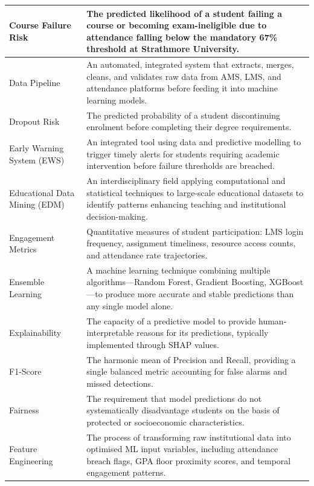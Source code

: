 \documentclass[12pt]{report}
\begin{document}
\begin{center}
\begin{longtable}{|L{3.8cm}|L{10cm}|}
 Course Failure Risk & The predicted likelihood of a student failing a course or becoming exam-ineligible due to attendance falling below the mandatory 67\% threshold at Strathmore University. \\ \hline
{} Data Pipeline & An automated, integrated system that extracts, merges, cleans, and validates raw data from AMS, LMS, and attendance platforms before feeding it into machine learning models. \\ \hline
{} Dropout Risk & The predicted probability of a student discontinuing enrolment before completing their degree requirements. \\ \hline
{} Early Warning System (EWS) & An integrated tool using data and predictive modelling to trigger timely alerts for students requiring academic intervention before failure thresholds are breached. \\ \hline
{} Educational Data Mining (EDM) & An interdisciplinary field applying computational and statistical techniques to large-scale educational datasets to identify patterns enhancing teaching and institutional decision-making. \\ \hline
{} Engagement Metrics & Quantitative measures of student participation: LMS login frequency, assignment timeliness, resource access counts, and attendance rate trajectories. \\ \hline
{} Ensemble Learning & A machine learning technique combining multiple algorithms---Random Forest, Gradient Boosting, XGBoost---to produce more accurate and stable predictions than any single model alone. \\ \hline
{} Explainability & The capacity of a predictive model to provide human-interpretable reasons for its predictions, typically implemented through SHAP values. \\ \hline
{} F1-Score & The harmonic mean of Precision and Recall, providing a single balanced metric accounting for false alarms and missed detections. \\ \hline
{} Fairness & The requirement that model predictions do not systematically disadvantage students on the basis of protected or socioeconomic characteristics. \\ \hline
{} Feature Engineering & The process of transforming raw institutional data into optimised ML input variables, including attendance breach flags, GPA floor proximity scores, and temporal engagement patterns. \\ \hline

\end{longtable}
\end{center}
\end{document}
